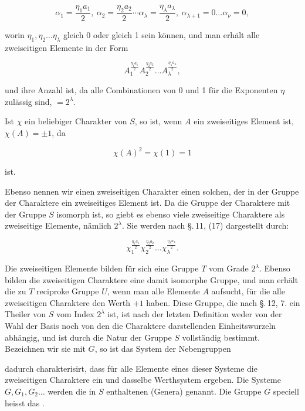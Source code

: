 
\[
\alpha_1 = \frac{\eta_1 a_1}{2},\ \alpha_2 = \frac{\eta_2 a_2}{2} \cdots \alpha_\lambda = \frac{\eta_\lambda a_\lambda}{2},\ \alpha_{\lambda+1}=0 \ldots \alpha_\nu = 0,
\]

worin $\eta_1, \eta_2 \ldots \eta_\lambda$ gleich 0 oder gleich 1 sein können, und man erhält alle zweiseitigen Elemente in der Form

\[
A_1^{\frac{\eta_1 a_1}{2}} A_2^{\frac{\eta_2 a_2}{2}} \ldots A_\lambda^{\frac{\eta_\lambda a_\lambda}{2}},
\]

und ihre Anzahl ist, da alle Combinationen von 0 und 1 für die Exponenten $\eta$ zulässig sind, $= 2^\lambda$.

Ist $\chi$ ein beliebiger Charakter von $S$, so ist, wenn $A$ ein zweiseitiges Element ist, $\chi(A) = \pm 1$, da

\[
\chi(A)^2 = \chi(1) = 1
\]

ist.

Ebenso nennen wir einen zweiseitigen Charakter einen solchen, der in der Gruppe der Charaktere ein zweiseitiges Element ist. Da die Gruppe der Charaktere mit der Gruppe $S$ isomorph ist, so giebt es ebenso viele zweiseitige Charaktere als zweiseitige Elemente, nämlich $2^\lambda$. Sie werden nach \S.\,11, (17) dargestellt durch:

\[
\chi_1^{\frac{\eta_1 a_1}{2}} \chi_2^{\frac{\eta_2 a_2}{2}} \ldots \chi_\lambda^{\frac{\eta_\lambda a_\lambda}{2}}.
\]


Die zweiseitigen Elemente bilden für sich eine Gruppe $T$ vom Grade $2^\lambda$. Ebenso bilden die zweiseitigen Charaktere eine damit isomorphe Gruppe, und man erhält die zu $T$ reciproke Gruppe $U$, wenn man alle Elemente $A$ aufsucht, für die alle zweiseitigen Charaktere den Werth $+1$ haben. Diese Gruppe, die nach \S.\,12, 7. ein Theiler von $S$ vom Index $2^\lambda$ ist, ist nach der letzten Definition weder von der Wahl der Basis noch von den die Charaktere darstellenden Einheitswurzeln abhängig, und ist durch die Natur der Gruppe $S$ vollständig bestimmt. Bezeichnen wir sie mit $G$, so ist das System der Nebengruppen


dadurch charakterisirt, dass für alle Elemente eines dieser Systeme die zweiseitigen Charaktere ein und dasselbe Werthsystem ergeben. Die Systeme $G, G_1, G_2 \ldots$ werden die in $S$ enthaltenen  (Genera) genannt. Die Gruppe $G$ speciell heisst das .
